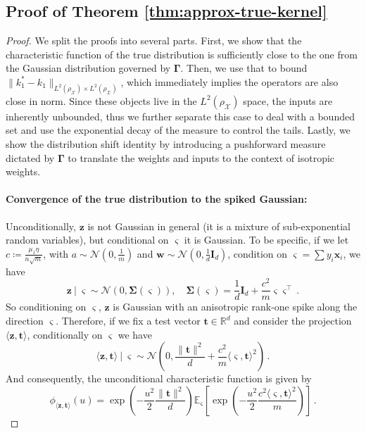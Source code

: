 
\subsection{Proof of Theorem \ref{thm:approx-true-kernel}}\label{app:thm-approx-true-kernel}
\begin{proof}
    We split the proofs into several parts. First, we show that the characteristic function of the true distribution is sufficiently close to the one from the Gaussian distribution governed by $\bm \Gamma$. Then, we use that to bound $\|k_1^* - k_1\|_{L^2(\rho_{\mathcal X})\times L^2(\rho_{\mathcal X})}$, which immediately implies the operators are also close in norm. Since these objects live in the $L^2(\rho_{\mathcal X})$ space, the inputs are inherently unbounded, thus we further separate this case to deal with a bounded set and use the exponential decay of the measure to control the tails. Lastly, we show the distribution shift identity by introducing a pushforward measure dictated by $\bm \Gamma$ to translate the weights and inputs to the context of isotropic weights.
    \item \paragraph{Convergence of the true distribution to the spiked Gaussian:}
    Unconditionally, $\bm z$ is not Gaussian in general (it is a mixture of sub-exponential random variables), but conditional on $\bm \varsigma$ it is Gaussian.
    To be specific, if we let $c \coloneqq \frac{\mu_1 \eta}{n \sqrt{m}}$, with $a \sim \mathcal N(0, \frac{1}{m})$ and $\bm w \sim \mathcal N(0, \frac{1}{d}\bm I_d)$, condition on $\bm \varsigma = \sum y_i \bm x_i$, we have
    \[
        \bm z \ | \ \bm \varsigma \sim \mathcal N(0, \bm \Sigma(\bm \varsigma)), \quad \bm \Sigma(\bm \varsigma) = \frac{1}{d}\bm I_d + \frac{c^2}{m}\bm \varsigma \bm \varsigma^\top\, .
    \]
    So conditioning on $\bm \varsigma$, $\bm z$ is Gaussian with an anisotropic rank-one spike along the direction $\bm \varsigma$. Therefore, if we fix a test vector $\bm t \in \mathbb R^d$ and consider the projection $\langle \bm z, \bm t\rangle$, conditionally on $\bm \varsigma$ we have
    \[
        \langle \bm z, \bm t\rangle \ | \ \bm \varsigma \sim \mathcal N\left(0, \frac{\|\bm t\|^2}{d} + \frac{c^2}{m}\langle \bm \varsigma, \bm t\rangle^2 \right)\, .
    \]
    And consequently, the unconditional characteristic function is given by
    \[
        \phi_{\langle \bm z, \bm t\rangle}(u) = \exp\left(- \frac{u^2}{2}\frac{\|\bm t\|^2}{d}\right) \mathbb E_{\bm \varsigma}\left[ \exp\left(- \frac{u^2}{2}\frac{c^2\langle \bm \varsigma, \bm t\rangle^2}{m}\right) \right]\, .
    \]
    

\end{proof}
